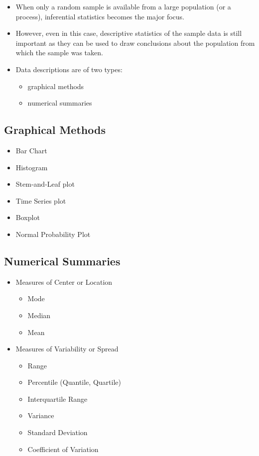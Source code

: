 \documentclass[
  letterpaper,
  DIV=11,
  numbers=noendperiod]{scrartcl}
\begin{document}
\begin{itemize}
\item
  When only a random sample is available from a large population (or a
  process), inferential statistics becomes the major focus.
\item
  However, even in this case, descriptive statistics of the sample data
  is still important as they can be used to draw conclusions about the
  population from which the sample was taken.
\item
  Data descriptions are of two types:\\

  \begin{itemize}
  \item
    graphical methods
  \item
    numerical summaries
  \end{itemize}
\end{itemize}

\subsection{Graphical Methods}\label{graphical-methods}

\begin{itemize}
\item
  Bar Chart
\item
  Histogram
\item
  Stem-and-Leaf plot
\item
  Time Series plot
\item
  Boxplot
\item
  Normal Probability Plot
\end{itemize}

\subsection{Numerical Summaries}\label{numerical-summaries}

\begin{itemize}
\item
  Measures of Center or Location

  \begin{itemize}
  \item
    Mode
  \item
    Median
  \item
    Mean
  \end{itemize}
\item
  Measures of Variability or Spread

  \begin{itemize}
  \item
    Range
  \item
    Percentile (Quantile, Quartile)
  \item
    Interquartile Range
  \item
    Variance
  \item
    Standard Deviation
  \item
    Coefficient of Variation
  \end{itemize}
\end{itemize}
\end{document}
